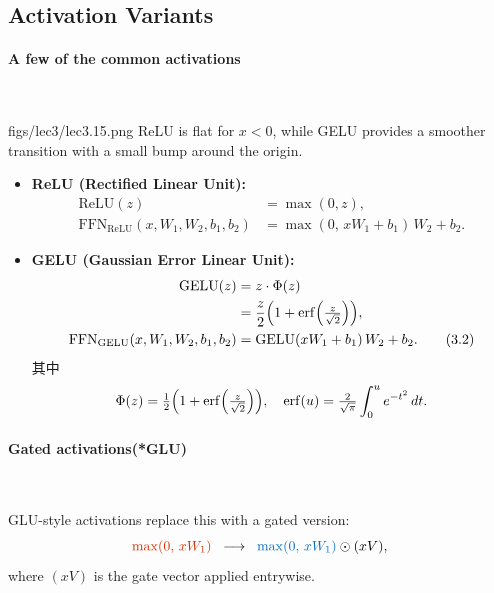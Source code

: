 \clearpage
\subsection{Activation Variants}
\paragraph{A few of the common activations}~{}

\MarginImageWithNote
  {figs/lec3/lec3.15.png}
  {}
  {ReLU is flat  for $x<0$, while GELU provides a smoother transition with a small bump around the origin.}

\begin{itemize}
  \item \textbf{ReLU (Rectified Linear Unit):}
  \begin{align*}
    \mathrm{ReLU}(z) &= \max(0, z), \\
    \mathrm{FFN}_{\mathrm{ReLU}}(x, W_1, W_2, b_1, b_2) 
      &= \max(0,\, xW_1+b_1)\,W_2 + b_2.
    \tag{3.1}
  \end{align*}

  \item \textbf{GELU (Gaussian Error Linear Unit):}
  \begin{align*}
    \mathrm{GELU}(z) &= z \cdot \Phi(z) \\
                     &= \frac{z}{2}\Bigl(1+\mathrm{erf}\!\left(\tfrac{z}{\sqrt{2}}\right)\Bigr), \\
    \mathrm{FFN}_{\mathrm{GELU}}(x, W_1, W_2, b_1, b_2) 
      &= \mathrm{GELU}(xW_1+b_1)\,W_2 + b_2.
    \tag{3.2}
  \end{align*}
  其中
  \[
  \Phi(z)=\tfrac{1}{2}\Bigl(1+\mathrm{erf}\!\left(\tfrac{z}{\sqrt{2}}\right)\Bigr),
  \quad
  \mathrm{erf}(u)=\tfrac{2}{\sqrt{\pi}}\int_0^u e^{-t^2}\,dt.
  \]
\end{itemize}


\paragraph{Gated activations(*GLU)}~{}

GLU-style activations replace this with a gated version:
\[
  {\color{tred}{\max(0,\,xW_1)}} 
  \;\;\longrightarrow\;\;
  {\color{dblue}{\max(0,\,xW_1)}} \odot (xV),
\]
where $(xV)$ is the gate vector applied entrywise.


